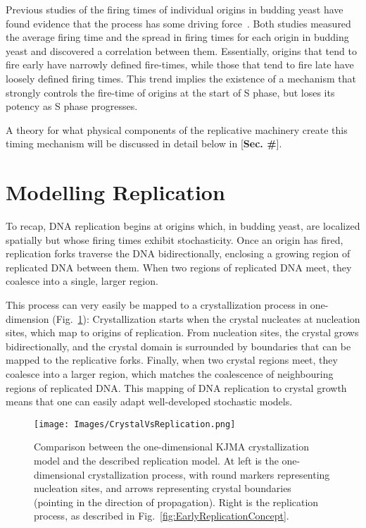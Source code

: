 		Previous studies of the firing times of individual origins in budding yeast have found evidence that the process has some driving force~\cite{ScottsPaper,StochasticTermination}.
		Both studies measured the average firing time and the spread in firing times for each origin in budding yeast and discovered a correlation between them.
		Essentially, origins that tend to fire early have narrowly defined fire-times, while those that tend to fire late have loosely defined firing times.
		This trend implies the existence of a mechanism that strongly controls the fire-time of origins at the start of S phase, but loses its potency as S phase progresses.
		
		A theory for what physical components of the replicative machinery create this timing mechanism will be discussed in detail below in  [\textbf{Sec. \#}].
		
		
	\section{Modelling Replication}
	\label{sec:Modelling}
	
	To recap, DNA replication begins at origins which, in budding yeast, are localized spatially but whose firing times exhibit stochasticity.
	Once an origin has fired, replication forks traverse the DNA bidirectionally, enclosing a growing region of replicated DNA between them.
	When two regions of replicated DNA meet, they coalesce into a single, larger region.
	
	This process can very easily be mapped to a crystallization process in one-dimension (Fig.~\ref{fig:CrystalVsReplication}):
	Crystallization starts when the crystal nucleates at nucleation sites, which map to origins of replication.
	From nucleation sites, the crystal grows bidirectionally, and the crystal domain is surrounded by boundaries that can be mapped to the replicative forks.
	Finally, when two crystal regions meet, they coalesce into a larger region, which matches the coalescence of neighbouring regions of replicated DNA.
	This mapping of DNA replication to crystal growth means that one can easily adapt well-developed stochastic models.
	
	\begin{figure}[tbh]
		\begin{center}
			\texttt{[image: Images/CrystalVsReplication.png]}
		\end{center}
			\caption[Comparing Crystallization with Replication]{\label{fig:CrystalVsReplication} Comparison between the one-dimensional KJMA crystallization model and the described replication model.
				At left is the one-dimensional crystallization process, with round markers representing nucleation sites, and arrows representing crystal boundaries (pointing in the direction of propagation).
				Right is the replication process, as described in Fig.~\ref{fig:EarlyReplicationConcept}.}
	\end{figure}
	
